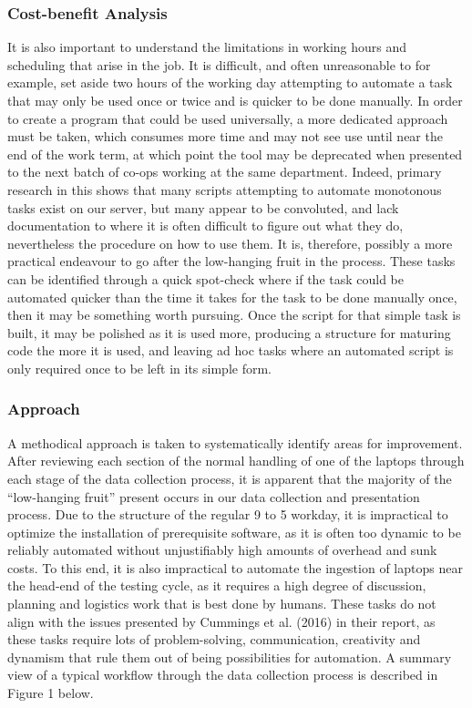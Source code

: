\documentclass[12pt]{article}
\begin{document}
\subsubsection{Cost-benefit Analysis}
It is also important to understand the limitations in working hours and scheduling that arise in the job. It is difficult, and often unreasonable to for example, set aside two hours of the working day attempting to automate a task that may only be used once or twice and is quicker to be done manually. In order to create a program that could be used universally, a more dedicated approach must be taken, which consumes more time and may not see use until near the end of the work term, at which point the tool may be deprecated when presented to the next batch of co-ops working at the same department. Indeed, primary research in this shows that many scripts attempting to automate monotonous tasks exist on our server, but many appear to be convoluted, and lack documentation to where it is often difficult to figure out what they do, nevertheless the procedure on how to use them. 
It is, therefore, possibly a more practical endeavour to go after the low-hanging fruit in the process. These tasks can be identified through a quick spot-check where if the task could be automated quicker than the time it takes for the task to be done manually once, then it may be something worth pursuing. Once the script for that simple task is built, it may be polished as it is used more, producing a structure for maturing code the more it is used, and leaving ad hoc tasks where an automated script is only required once to be left in its simple form. 

\subsubsection{Approach}
	A methodical approach is taken to systematically identify areas for improvement. After reviewing each section of the normal handling of one of the laptops through each stage of the data collection process, it is apparent that the majority of the “low-hanging fruit” present occurs in our data collection and presentation process. Due to the structure of the regular 9 to 5 workday, it is impractical to optimize the installation of prerequisite software, as it is often too dynamic to be reliably automated without unjustifiably high amounts of overhead and sunk costs. To this end, it is also impractical to automate the ingestion of laptops near the head-end of the testing cycle, as it requires a high degree of discussion, planning and logistics work that is best done by humans. These tasks do not align with the issues presented by Cummings et al. (2016) in their report, as these tasks require lots of problem-solving, communication, creativity and dynamism that rule them out of being possibilities for automation. A summary view of a typical workflow through the data collection process is described in Figure 1 below.
\end{document}
